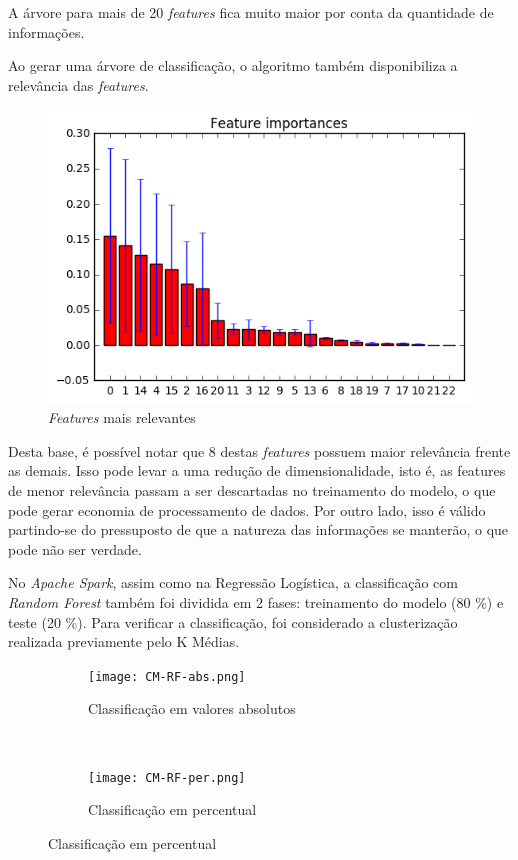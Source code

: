 A árvore para mais de 20 \emph{features} fica muito maior por conta da quantidade de informações.


Ao gerar uma árvore de classificação, o algoritmo também disponibiliza a relevância das \emph{features}.

\begin{figure}[!ht]
\caption{\emph{Features} mais relevantes}
\centerline{\includegraphics[width=.7\textwidth]{img/tree-most-important-features}}
\end{figure}

Desta base, é possível notar que 8 destas \emph{features} possuem maior relevância frente as demais. Isso pode levar a uma redução de dimensionalidade, isto é, as features de menor relevância passam a ser descartadas no treinamento do modelo, o que pode gerar economia de processamento de dados. Por outro lado, isso é válido partindo-se do pressuposto de que a natureza das informações se manterão, o que pode não ser verdade.


No \emph{Apache Spark}, assim como na Regressão Logística, a classificação com \emph{Random Forest} também foi dividida em 2 fases: treinamento do modelo (80 \%) e teste (20 \%). Para verificar a classificação, foi considerado a clusterização realizada previamente pelo K Médias. 



\begin{figure}[!ht]
    \centering
        \caption{Resultados da clusterização da \emph{Random Forest}}
    \begin{subfigure}[t]{0.45\textwidth}
        \centering
\texttt{[image: CM-RF-abs.png]}

        \caption{Classificação em valores absolutos}
    \end{subfigure}%
    ~ 
    \begin{subfigure}[t]{0.45\textwidth}
        \centering
        \texttt{[image: CM-RF-per.png]}
        \caption{Classificação em percentual}
    \end{subfigure}

\end{figure}


